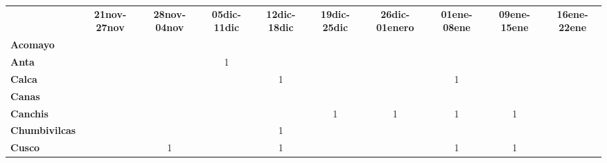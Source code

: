 \begin{tabular}{lccccccccc}
	&\textbf{21nov-27nov} 	  					&\textbf{28nov-04nov} 	
	&\textbf{05dic-11dic}						&\textbf{12dic-18dic}			&\textbf{19dic-25dic}
	&\textbf{26dic-01enero}						&\textbf{01ene-08ene}			&\textbf{09ene-15ene}
	&\textbf{16ene-22ene}\\
	\textbf{Acomayo}                        	
	&\cellcolor[HTML]{FCC46C}                   &\cellcolor[HTML]{FCC46C}  			        &\cellcolor[HTML]{FCC46C}          			&\cellcolor[HTML]{FCC46C} 					&\cellcolor[HTML]{FCC46C} 	    			&\cellcolor[HTML]{FCC46C}				    &\cellcolor[HTML]{FCC46C}
	&\cellcolor[HTML]{FCC46C}				&\cellcolor[HTML]{FCC46C}\\
	\textbf{Anta}                                                          		
	&\cellcolor[HTML]{FCC46C}					&\cellcolor[HTML]{FCC46C} 					
	&1											&\cellcolor[HTML]{FCC46C}					
	&\cellcolor[HTML]{FCC46C}					&\cellcolor[HTML]{FCC46C} 
	&\cellcolor[HTML]{FCC46C}					&\cellcolor[HTML]{FCC46C}
	&\cellcolor[HTML]{FCC46C}\\
	\textbf{Calca}      				       
	&\cellcolor[HTML]{FCC46C}                   &\cellcolor[HTML]{FCC46C}  		            &\cellcolor[HTML]{FCC46C} 					&1 								            
	&\cellcolor[HTML]{FCC46C}					&\cellcolor[HTML]{FCC46C} 
	&1											&\cellcolor[HTML]{FCC46C}	&\cellcolor[HTML]{FCC46C}\\                										
	\textbf{Canas}                              
	 &\cellcolor[HTML]{FCC46C} 					&\cellcolor[HTML]{FCC46C}       			&\cellcolor[HTML]{FCC46C} 
	&\cellcolor[HTML]{FCC46C} 					&\cellcolor[HTML]{FCC46C} 		&\cellcolor[HTML]{FCC46C}					&\cellcolor[HTML]{FCC46C} 		
	&\cellcolor[HTML]{FCC46C}					&\cellcolor[HTML]{FCC46C}\\
	\textbf{Canchis}                            
	&\cellcolor[HTML]{FCC46C}   				&\cellcolor[HTML]{FCC46C} 							&\cellcolor[HTML]{FCC46C}					&\cellcolor[HTML]{FCC46C} 		
	&1											&1
	&1											&1
	&\cellcolor[HTML]{FCC46C}\\
	\textbf{Chumbivilcas}                      
	&\cellcolor[HTML]{FCC46C}   			    &\cellcolor[HTML]{FCC46C}
	&\cellcolor[HTML]{FCC46C}					&1			
	&\cellcolor[HTML]{FCC46C}					&\cellcolor[HTML]{FCC46C}
	&\cellcolor[HTML]{FCC46C}					&\cellcolor[HTML]{FCC46C}
	&\cellcolor[HTML]{FCC46C} \\
	\textbf{Cusco}                             
	&\cellcolor[HTML]{FCC46C} 		 			&1											
	&\cellcolor[HTML]{FCC46C}					&1											
	&\cellcolor[HTML]{FCC46C}					&\cellcolor[HTML]{FCC46C}
	&1											&1
	&\cellcolor[HTML]{FCC46C}\\

\end{tabular}

